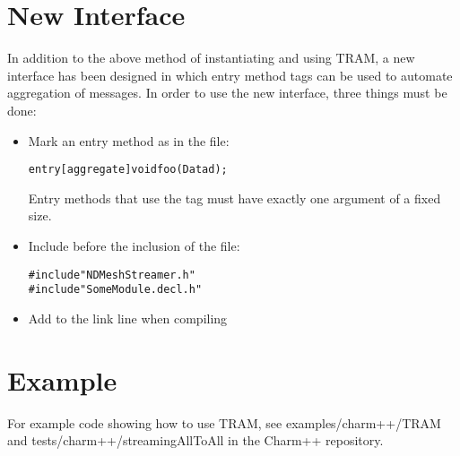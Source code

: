 
\section{New Interface}

In addition to the above method of instantiating and using TRAM, a new
interface has been designed in which entry method tags can be used to automate
aggregation of messages. In order to use the new interface, three things must be
done:

\begin{itemize}
\item{Mark an entry method as \code{[aggregate]} in the  file:}
\begin{alltt}
entry [aggregate] void foo(Data d);
\end{alltt}
Entry methods that use the \code{[aggregate]} tag must have exactly one argument of a
fixed size.
\item{Include  before the inclusion of the
 file:}
\begin{alltt}
#include "NDMeshStreamer.h"
#include "SomeModule.decl.h"
\end{alltt}
\item{Add  to the link line when compiling}
\end{itemize}

\section{Example}

For example code showing how to use TRAM, see examples/charm++/TRAM and
tests/charm++/streamingAllToAll in the Charm++ repository.

\thispagestyle{empty}
\pagestyle{empty}
